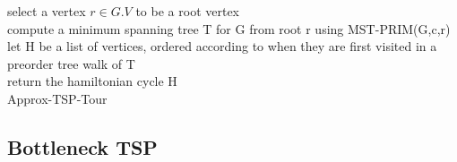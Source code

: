 \documentclass[runningheads, a4paper]{llncs}
\begin{document}
        
        \begin{algorithm}[H]
            select a vertex $r \in G.V$ to be a root vertex \\
            
            compute a minimum spanning tree T for G from root r using MST-PRIM(G,c,r) \\
            
            let H be a list of vertices, ordered according to when they are first visited in a preorder tree walk of T \\
            
            return the hamiltonian cycle H \\
            
            
            
            \caption{Approx-TSP-Tour}
            \label{algo:hc_improved}
        \end{algorithm}
        
        
        \subsection{Bottleneck TSP}
        
\end{document}

